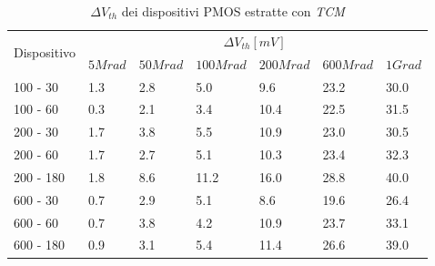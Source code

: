 \documentclass[12pt, letterpaper]{book}
\begin{document}
\begin{table}[H]
  \renewcommand{\arraystretch}{1.3}
  \begin{tabular}{m{2cm}  m{1.1cm} m{1.3cm} m{1.5cm} m{1.5cm} m{1.5cm} m{1cm}}
    \toprule
    \multirow{2}{*}{Dispositivo} & \multicolumn{6}{c}{$\Delta V_{th} [mV] $}                                                          \\
    \cmidrule{2-7}
                                 & $5Mrad$                            & $50Mrad$ & $100Mrad$ & $200Mrad$ & $600Mrad$ & $1Grad$ \\
    \midrule
    100 - 30                     & 1.3                                & 2.8      & 5.0       & 9.6       & 23.2      & 30.0    \\
    \hline
    100 - 60                     & 0.3                                & 2.1      & 3.4       & 10.4      & 22.5      & 31.5    \\
    \hline
    200 - 30                     & 1.7                                & 3.8      & 5.5       & 10.9      & 23.0      & 30.5    \\
    \hline
    200 - 60                     & 1.7                                & 2.7      & 5.1       & 10.3      & 23.4      & 32.3    \\
    \hline
    200 - 180                    & 1.8                                & 8.6      & 11.2      & 16.0      & 28.8      & 40.0    \\
    \hline
    600 - 30                     & 0.7                                & 2.9      & 5.1       & 8.6       & 19.6      & 26.4    \\
    \hline
    600 - 60                     & 0.7                                & 3.8      & 4.2       & 10.9      & 23.7      & 33.1    \\
    \hline
    600 - 180                    & 0.9                                & 3.1      & 5.4       & 11.4      & 26.6      & 39.0    \\
    \bottomrule
  \end{tabular}
  \caption{$\Delta V_{th}$ dei dispositivi PMOS estratte con \emph{TCM}}
  \label{tab:deltaVthTCMP}
\end{table}
\end{document}
